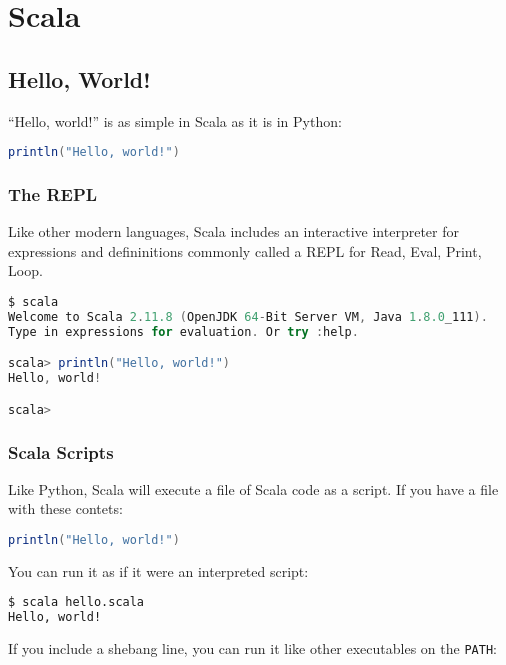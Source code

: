 \chapter{Scala}\label{ch:scala}

\section{Hello, World!}

``Hello, world!'' is as simple in Scala as it is in Python:

\begin{lstlisting}[language=Scala]
println("Hello, world!")
\end{lstlisting}

\subsection{The REPL}

Like other modern languages, Scala includes an interactive interpreter for expressions and defininitions commonly called a REPL for Read, Eval, Print, Loop.

\begin{lstlisting}[language=Scala]
$ scala
Welcome to Scala 2.11.8 (OpenJDK 64-Bit Server VM, Java 1.8.0_111).
Type in expressions for evaluation. Or try :help.

scala> println("Hello, world!")
Hello, world!

scala>
\end{lstlisting}


\subsection{Scala Scripts}

Like Python, Scala will execute a file of Scala code as a script. If you have a file with these contets:

\begin{lstlisting}[language=Scala]
println("Hello, world!")
\end{lstlisting}

You can run it as if it were an interpreted script:

\begin{lstlisting}[language=Bash]
$ scala hello.scala
Hello, world!
\end{lstlisting}

If you include a shebang line, you can run it like other executables on the {\tt PATH}:

